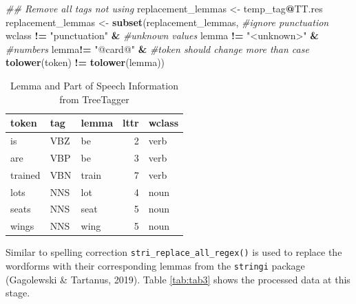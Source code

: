 \documentclass[man]{apa6}
\newenvironment{Shaded}{\begin{snugshade}}{\end{snugshade}}
\newcommand{\CommentTok}[1]{\textcolor[rgb]{0.56,0.35,0.01}{\textit{#1}}}
\newcommand{\KeywordTok}[1]{\textcolor[rgb]{0.13,0.29,0.53}{\textbf{#1}}}
\newcommand{\NormalTok}[1]{#1}
\newcommand{\OperatorTok}[1]{\textcolor[rgb]{0.81,0.36,0.00}{\textbf{#1}}}
\newcommand{\StringTok}[1]{\textcolor[rgb]{0.31,0.60,0.02}{#1}}
\begin{document}
\begin{Shaded}
\begin{Highlighting}[]
\CommentTok{## Remove all tags not using}
\NormalTok{replacement_lemmas <-}\StringTok{ }\NormalTok{temp_tag}\OperatorTok{@}\NormalTok{TT.res}
\NormalTok{replacement_lemmas <-}\StringTok{ }\KeywordTok{subset}\NormalTok{(replacement_lemmas, }
                             \CommentTok{#ignore punctuation}
\NormalTok{                             wclass }\OperatorTok{!=}\StringTok{ "punctuation"} \OperatorTok{&}
\StringTok{                             }\CommentTok{#unknown values}
\StringTok{                             }\NormalTok{lemma }\OperatorTok{!=}\StringTok{ "<unknown>"} \OperatorTok{&}\StringTok{ }
\StringTok{                             }\CommentTok{#numbers}
\StringTok{                             }\NormalTok{lemma}\OperatorTok{!=}\StringTok{ "@card@"} \OperatorTok{&}\StringTok{ }
\StringTok{                             }\CommentTok{#token should change more than case}
\StringTok{                             }\KeywordTok{tolower}\NormalTok{(token) }\OperatorTok{!=}\StringTok{ }\KeywordTok{tolower}\NormalTok{(lemma)) }
\end{Highlighting}
\end{Shaded}

\normalsize

\begin{table}[t]

\caption{\label{tab:tab2}Lemma and Part of Speech Information from TreeTagger}
\centering
\begin{tabular}{lllrl}
\toprule
token & tag & lemma & lttr & wclass\\
\midrule
is & VBZ & be & 2 & verb\\
are & VBP & be & 3 & verb\\
trained & VBN & train & 7 & verb\\
lots & NNS & lot & 4 & noun\\
seats & NNS & seat & 5 & noun\\
\addlinespace
wings & NNS & wing & 5 & noun\\
\bottomrule
\end{tabular}
\end{table}

Similar to spelling correction \texttt{stri\_replace\_all\_regex()} is used to replace the wordforms with their corresponding lemmas from the \texttt{stringi} package (Gagolewski \& Tartanus, 2019). Table \ref{tab:tab3} shows the processed data at this stage.
\end{document}
